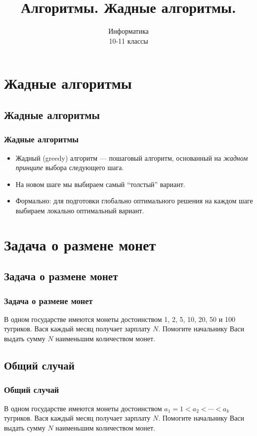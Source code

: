 \documentclass[compress,red]{beamer}
\title{Алгоритмы. Жадные алгоритмы.}
\author{Информатика \\ 10-11 классы}
\begin{document}
\maketitle

\section{Жадные алгоритмы}
\subsection{Жадные алгоритмы}
\begin{frame}[fragile]
\frametitle{Жадные алгоритмы}
		\begin{itemize}
		\item Жадный (greedy) алгоритм --- пошаговый алгоритм, основанный на \emph{жадном принципе} выбора следующего шага.
		\item На новом шаге мы выбираем самый ``толстый'' вариант.
		\item Формально: для подготовки глобально оптимального решения на каждом шаге выбираем локально оптимальный вариант.
		\end{itemize}
\end{frame}

\section{Задача о размене монет}
\subsection{Задача о размене монет}
\begin{frame}[fragile]
\frametitle{Задача о размене монет}
	\begin{center}
		\large{В одном государстве имеются монеты достоинством 1, 2, 5, 10, 20, 50 и 100 тугриков. Вася каждый месяц получает зарплату $N$. Помогите начальнику Васи выдать сумму $N$ наименьшим количеством монет.}
	\end{center}
\end{frame}

\subsection{Общий случай}
\begin{frame}[fragile]
\frametitle{Общий случай}
	\begin{center}
		\large{В одном государстве имеются монеты достоинством $a_1 = 1 < a_2 < \cdots < a_k$ тугриков. Вася каждый месяц получает зарплату $N$. Помогите начальнику Васи выдать сумму $N$ наименьшим количеством монет.}
	\end{center}
\end{frame}
\end{document}
